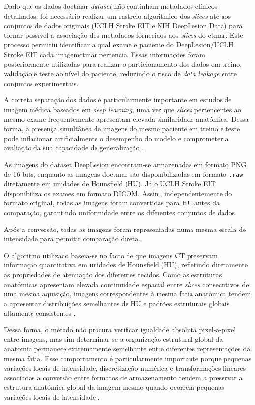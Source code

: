Dado que os dados do\acrshort{ctmar} \textit{dataset} não continham metadados clínicos detalhados, foi necessário realizar um rastreio algorítmico dos \textit{slices} até aos conjuntos de dados originais (UCLH Stroke EIT e NIH DeepLesion Data) para tornar possível a associação dos metadados fornecidos aos \textit{slices} do \acrshort{ctmar}. Este processo permitiu identificar a qual exame e paciente do DeepLesion/UCLH Stroke EIT cada imagem\acrshort{ctmar} pertencia. Essas informações foram posteriormente utilizadas para realizar o particionamento dos dados em treino, validação e teste ao nível do paciente, reduzindo o risco de \textit{data leakage} entre conjuntos experimentais.

A correta separação dos dados é particularmente importante em estudos de imagem médica baseados em \textit{deep learning}, uma vez que \textit{slices} pertencentes ao mesmo exame frequentemente apresentam elevada similaridade anatómica. Dessa forma, a presença simultânea de imagens do mesmo paciente em treino e teste pode inflacionar artificialmente o desempenho do modelo e comprometer a avaliação da sua capacidade de generalização \cite{onerTrainingMachineLearning2020}.

As imagens do dataset DeepLesion \cite{yanDeepLesionAutomatedMining2018} encontram-se armazenadas em formato PNG de 16 bits, enquanto as imagens do\acrshort{ctmar} são disponibilizadas em formato \texttt{.raw} diretamente em unidades de Hounsfield (HU). Já o UCLH Stroke EIT \cite{gorenMultifrequencyElectricalImpedance2018} disponibiliza os exames em formato DICOM. Assim, independentemente do formato original, todas as imagens foram convertidas para HU antes da comparação, garantindo uniformidade entre os diferentes conjuntos de dados.

Após a conversão, todas as imagens foram representadas numa mesma escala de intensidade para permitir comparação direta.

O algoritmo utilizado baseia-se no facto de que imagens CT preservam informação quantitativa em unidades de Hounsfield (HU), refletindo diretamente as propriedades de atenuação dos diferentes tecidos. Como as estruturas anatómicas apresentam elevada continuidade espacial entre \textit{slices} consecutivos de uma mesma aquisição, imagens correspondentes à mesma fatia anatómica tendem a apresentar distribuições semelhantes de HU e padrões estruturais globais altamente consistentes \cite{zhouwangImageQualityAssessment2004,hsiehComputedTomographyPrinciples2009}.

Dessa forma, o método não procura verificar igualdade absoluta pixel-a-pixel entre imagens, mas sim determinar se a organização estrutural global da anatomia permanece extremamente semelhante entre diferentes representações da mesma fatia. Esse comportamento é particularmente importante porque pequenas variações locais de intensidade, discretização numérica e transformações lineares associadas à conversão entre formatos de armazenamento tendem a preservar a estrutura anatómica global da imagem mesmo quando ocorrem pequenas variações locais de intensidade \cite{zhouwangImageQualityAssessment2004,hsiehComputedTomographyPrinciples2009}. 


